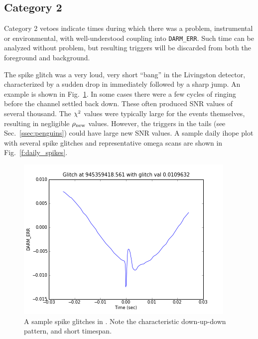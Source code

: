 \subsection{Category 2}

Category 2 vetoes indicate times during which there was a problem,
instrumental or environmental, with well-understood coupling into
\texttt{DARM\_ERR}.  Such time can be analyzed without problem, but
resulting triggers will be discarded from both the foreground and
background.


The spike glitch was a very loud, very short ``bang'' in the
Livingston detector, characterized by a sudden drop in \darmerr
immediately followed by a sharp jump.  An example is shown in
Fig.~\ref{f:spike_glitch_example}.  In some cases there were a few
cycles of ringing before the channel settled back down.  These often
produced SNR values of several thousand.  The $\chi^2$ values were
typically large for the events themselves, resulting in negligible
$\rho_{\textrm{new}}$ values.  However, the triggers in the tails (see
Sec.~\ref{ssec:penguins}) could have large new SNR values.  A
sample daily ihope plot with several spike glitches and representative
omega scans are shown in Fig.~\ref{f:daily_spikes}.

\begin{figure}
  \includegraphics[width=\linewidth]{figures/detchar/spike_glitch_example}
  \caption[The spike glitch]{
  \label{f:spike_glitch_example}
A sample spike glitches in \darmerr.  Note the characteristic
down-up-down pattern, and short timespan.}
\end{figure}%

